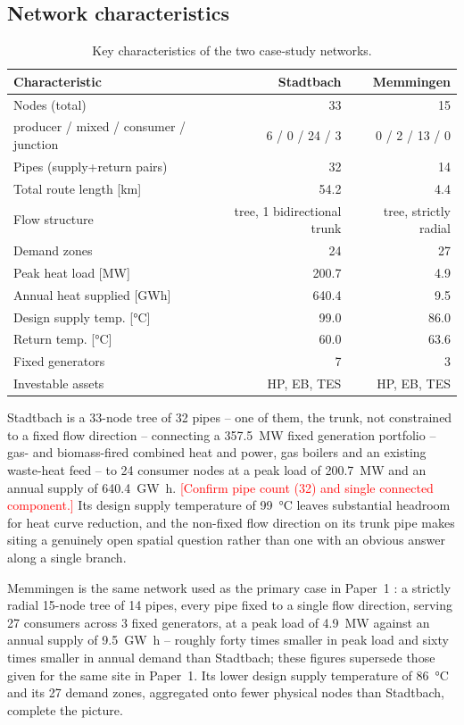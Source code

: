 \documentclass[review,3p]{elsarticle}
\newcommand{\placeholder}[1]{\textcolor{red}{[#1]}}
\begin{document}
\subsection{Network characteristics}
\label{sec:cases:networks}

\begin{table}[htbp]
  \centering
  \caption{Key characteristics of the two case-study networks.}
  \label{tab:T1}
  \begin{tabular}{lrr}
  \toprule
  Characteristic & Stadtbach & Memmingen \\
  \midrule
  Nodes (total) & 33 & 15 \\
  \quad producer / mixed / consumer / junction & 6 / 0 / 24 / 3 & 0 / 2 / 13 / 0 \\
  Pipes (supply+return pairs) & 32 & 14 \\
  Total route length [km] & 54.2 & 4.4 \\
  Flow structure & tree, 1 bidirectional trunk & tree, strictly radial \\
  Demand zones & 24 & 27 \\
  Peak heat load [MW] & 200.7 & 4.9 \\
  Annual heat supplied [GWh] & 640.4 & 9.5 \\
  Design supply temp. [\si{\celsius}] & 99.0 & 86.0 \\
  Return temp. [\si{\celsius}] & 60.0 & 63.6 \\
  Fixed generators & 7 & 3 \\
  Investable assets & HP, EB, TES & HP, EB, TES \\
  \bottomrule
  \end{tabular}
\end{table}

Stadtbach is a \num{33}-node tree of \num{32} pipes -- one of them,
the trunk, not constrained to a fixed flow direction -- connecting a
\SI{357.5}{\mega\watt} fixed generation portfolio -- gas- and
biomass-fired combined heat and power, gas boilers and an existing
waste-heat feed -- to \num{24} consumer nodes at a peak load of
\SI{200.7}{\mega\watt} and an annual supply of \SI{640.4}{\giga\watt
\hour}. \placeholder{Confirm pipe count (32) and single connected
component.} Its design supply temperature of \SI{99}{\celsius}
leaves substantial headroom for heat curve reduction, and the
non-fixed flow direction on its trunk pipe makes siting a genuinely
open spatial question rather than one with an obvious answer along a
single branch.

Memmingen is the same network used as the primary case in Paper~1
\cite{Ruess.2026}: a strictly radial \num{15}-node tree of \num{14}
pipes, every pipe fixed to a single flow direction, serving
\num{27} consumers across \num{3} fixed generators, at a peak load of
\SI{4.9}{\mega\watt} against an annual supply of \SI{9.5}{\giga\watt
\hour} -- roughly forty times smaller in peak load and sixty times
smaller in annual demand than Stadtbach; these figures supersede those
given for the same site in Paper~1. Its lower design
supply temperature of \SI{86}{\celsius} and its \num{27} demand zones,
aggregated onto fewer physical nodes than Stadtbach, complete the
picture.
\end{document}
